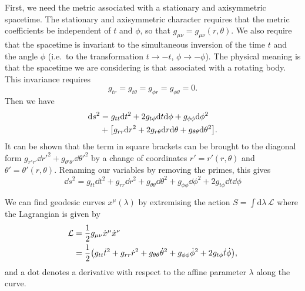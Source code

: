 First, we need the metric associated with a stationary and axisymmetric spacetime. 
The stationary and axisymmetric character requires that the metric coefficients be independent of $t$ and $\phi$, so that $g_{\mu \nu} = g_{\mu \nu}(r,\theta)$.
We also require that the spacetime is invariant to the simultaneous inversion of the time $t$ and the angle $\phi$ (i.e.\ to the transformation $t \rightarrow -t$, $\phi \rightarrow -\phi$). 
The physical meaning is that the spacetime we are considering is that associated with a rotating body. 
This invariance requires 
\begin{equation}
	g_{tr} = g_{t \theta} = g_{\phi r} = g_{\phi \theta} = 0.
\end{equation}
Then we have 
\begin{align}
	\dd s^2 &= g_{tt}\dd t^2 + 2g_{t \phi} \dd t \dd \phi + g_{\phi \phi}\dd \phi^2 \nonumber \\
	&+ \qty[ g_{rr}\dd r^2 + 2g_{r \theta} \dd r \dd \theta + g_{\theta \theta} \dd \theta^2 ].
\end{align}
It can be shown \cite{Chandrasekhar:1985kt} that the term in square brackets can be brought to the diagonal form $g_{r'r'}\dd r'^2 +  g_{\theta' \theta'} \dd \theta'^2$ by a change of coordinates $r'=r'(r,\theta)$ and $\theta'=\theta'(r,\theta)$.
Renaming our variables by removing the primes, this gives
\begin{equation}
	\dd s^2 = g_{tt}\dd t^2 + g_{rr}\dd r^2 + g_{\theta \theta}\dd \theta^2 + g_{\phi \phi}\dd \phi^2 + 2g_{t \phi}\dd t\dd \phi
\end{equation}

We can find geodesic curves $x^\mu(\lambda)$ by extremising the action $S=\int\mathrm{d}\lambda\,\mathcal{L}$ where the Lagrangian is given by
\begin{align}
	\mathcal{L} &= \frac{1}{2}g_{\mu \nu} \dot{x}^\mu \dot{x}^\nu \\
	&= \frac{1}{2}\qty(g_{tt}\dot{t}^2 + g_{rr}\dot{r}^2 + g_{\theta \theta}\dot{\theta}^2 + g_{\phi \phi}\dot{\phi}^2 + 2g_{t \phi}\dot{t}\dot{\phi}), \nonumber
\end{align}
and a dot denotes a derivative with respect to the affine parameter $\lambda$ along the curve. 

